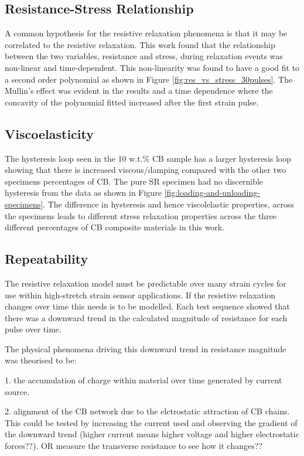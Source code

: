 \subsection{Resistance-Stress Relationship}
A common hypothesis for the resistive relaxation phenomena is that it may be correlated to the resistive relaxation. This work found that the relationship between the two variables, resistance and stress, during relaxation events was non-linear and time-dependent. This non-linearity was found to have a good fit to a second order polynomial as shown in Figure \ref{fig:res_vs_stress_30pulses}. The Mullin's effect was evident in the results and a time dependence where the concavity of the polynomial fitted increased after the first strain pulse.


\subsection{Viscoelasticity}
The hysteresis loop seen in the 10 w.t.\% CB sample has a larger hysteresis loop showing that there is increased viscous/damping compared with the other two specimens percentages of CB. The pure SR specimen had no discernible hysteresis from the data as shown in Figure \ref{fig:loading-and-unloading-specimens}.  The difference in hysteresis and hence viscolelastic properties, across the specimens leads to different stress relaxation properties across the three different percentages of CB composite materials in this work.


\subsection{Repeatability}
The resistive relaxation model must be predictable over many strain cycles for use within high-stretch strain sensor applications. If the resistive relaxation changes over time this needs is to be modelled. Each test sequence showed that there was a downward trend in the calculated magnitude of resistance for each pulse over time. 

The physical phenomena driving this downward trend in resistance magnitude was theorised to be:

1. the accumulation of charge within material over time generated by current source.

2. alignment of the CB network due to the elctrostatic attraction of CB chains. This could be tested by increasing the current used and observing the gradient of the downward trend (higher current means higher voltage and higher electrostatic forces??). OR measure the transverse resistance to see how it changes??

